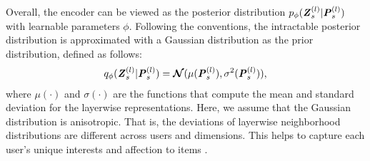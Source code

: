 \documentclass[letterpaper]{article} %
\begin{document}
Overall, the encoder can be viewed as the posterior distribution $p_{\phi}(\textbf{\textit{Z}}_s^{(l)}|\textbf{\textit{P}}_s^{(l)})$ with learnable parameters $\phi$. Following the conventions, the intractable posterior distribution is approximated with a Gaussian distribution as the prior distribution, defined as follows:
\begin{align}
    q_{\phi}(\textbf{\textit{Z}}_s^{(l)}|\textbf{\textit{P}}_s^{(l)}) = \boldsymbol{\mathcal{N}}(\mu(\textbf{\textit{P}}_s^{(l)}), \sigma^2(\textbf{\textit{P}}_s^{(l)})),
\end{align}
where $\mu(\cdot)$ and $\sigma(\cdot)$ are the functions that compute the mean and standard deviation for the layerwise representations. Here, we assume that the Gaussian distribution is anisotropic. That is, the deviations of layerwise neighborhood distributions are different across users and dimensions. This helps to capture each user's unique interests and affection to items \cite{ESRF}. 
\end{document}
